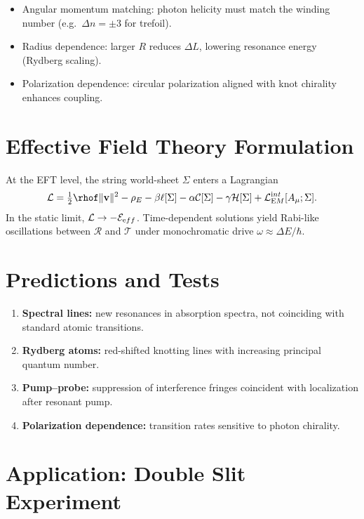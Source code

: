 \documentclass[11pt,a4paper]{article}
\begin{document}
        \begin{itemize}
        \item Angular momentum matching: photon helicity must match the winding number (e.g.\ $\Delta n=\pm 3$ for trefoil).
        \item Radius dependence: larger $R$ reduces $\Delta L$, lowering resonance energy (Rydberg scaling).
        \item Polarization dependence: circular polarization aligned with knot chirality enhances coupling.
        \end{itemize}

\section{Effective Field Theory Formulation}

    At the EFT level, the string world-sheet $\Sigma$ enters a Lagrangian
    \begin{equation}
    \mathcal L = \tfrac12 \rhof \|\mathbf v\|^2 - \rho_E
    - \beta \ell[\Sigma] - \alpha \mathcal C[\Sigma]
    - \gamma \mathcal H[\Sigma] + \mathcal L_{\textrm EM}^{\textrm int}[A_\mu;\Sigma].
    \end{equation}
    In the static limit, $\mathcal L \to -\mathcal E_{\textrm eff}$.
    Time-dependent solutions yield Rabi-like oscillations between $\mathcal R$ and $\mathcal T$
    under monochromatic drive $\omega\approx \Delta E/\hbar$.

\section{Predictions and Tests}

    \begin{enumerate}
    \item \textbf{Spectral lines:} new resonances in absorption spectra, not coinciding with standard atomic transitions.
    \item \textbf{Rydberg atoms:} red-shifted knotting lines with increasing principal quantum number.
    \item \textbf{Pump--probe:} suppression of interference fringes coincident with localization after resonant pump.
    \item \textbf{Polarization dependence:} transition rates sensitive to photon chirality.
    \end{enumerate}

\section{Application: Double Slit Experiment}
\end{document}
